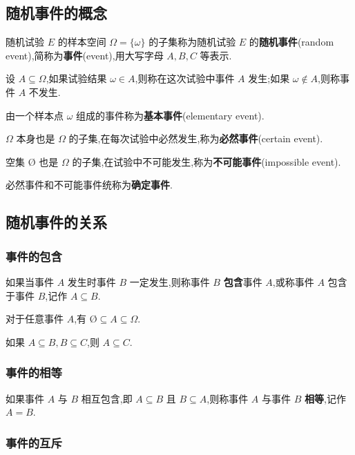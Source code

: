 \subsection{随机事件的概念}

随机试验 $E$ 的样本空间 $\varOmega = \{ \omega \}$ 的子集称为随机试验 $E$ 的\textbf{随机事件}(random event),简称为\textbf{事件}(event),用大写字母 $A,B,C$ 等表示.

设 $A \subseteq \varOmega$,如果试验结果 $\omega \in A$,则称在这次试验中事件 $A$ 发生;如果 $\omega \notin A$,则称事件 $A$ 不发生.

由一个样本点 $\omega$ 组成的事件称为\textbf{基本事件}(elementary event).

$\varOmega$ 本身也是 $\varOmega$ 的子集,在每次试验中必然发生,称为\textbf{必然事件}(certain event).

空集 $\text{\O}$ 也是 $\varOmega$ 的子集,在试验中不可能发生,称为\textbf{不可能事件}(impossible event).

必然事件和不可能事件统称为\textbf{确定事件}.

\subsection{随机事件的关系}

\subsubsection{事件的包含}

如果当事件 $A$ 发生时事件 $B$ 一定发生,则称事件 $B$ \textbf{包含}事件 $A$,或称事件 $A$ 包含于事件 $B$,记作 $A \subseteq B$.

\begin{property}
    \indent 对于任意事件 $A$,有 $\text{\O} \subseteq A \subseteq \varOmega$.
\end{property}

\begin{property}
    \indent 如果 $A \subseteq B, B \subseteq C$,则 $A\subseteq C$.
\end{property}

\subsubsection{事件的相等}

如果事件 $A$ 与 $B$ 相互包含,即 $A \subseteq B$ 且 $B \subseteq A$,则称事件 $A$ 与事件 $B$ \textbf{相等},记作 $A=B$.

\subsubsection{事件的互斥}

